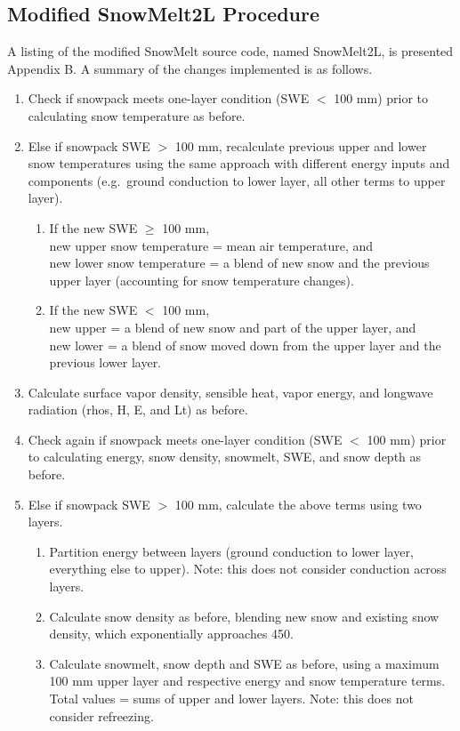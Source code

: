 \documentclass[12pt]{article}
\begin{document}
\subsection{Modified SnowMelt2L Procedure}
A listing of the modified SnowMelt source code, named SnowMelt2L, is presented Appendix B.
A summary of the changes implemented is as follows.
\begin{enumerate}
  \item Check if snowpack meets one-layer condition (SWE $<$ 100 mm) prior to calculating snow temperature as before.
  \item Else if snowpack SWE $>$ 100 mm, recalculate previous upper and lower snow temperatures using the same approach with different energy inputs and components (e.g.\ ground conduction to lower layer, all other terms to upper layer).
  \begin{enumerate}
    \item If the new SWE $\geq$ 100 mm, \\
    new upper snow temperature = mean air temperature, and \\
    new lower snow temperature = a blend of new snow and the previous upper layer (accounting for snow temperature changes).
    \item If the new SWE $<$ 100 mm, \\
    new upper = a blend of new snow and part of the upper layer, and \\
    new lower = a blend of snow moved down from the upper layer and the previous lower layer.
  \end{enumerate}
  \item Calculate surface vapor density, sensible heat, vapor energy, and longwave radiation (rhos, H, E, and Lt) as before.
  \item Check again if snowpack meets one-layer condition (SWE $<$ 100 mm) prior to calculating energy, snow density, snowmelt, SWE, and snow depth as before.
  \item Else if snowpack SWE $>$ 100 mm, calculate the above terms using two layers.
  \begin{enumerate}
    \item Partition energy between layers (ground conduction to lower layer, everything else to upper). Note: this does not consider conduction across layers.
    \item Calculate snow density as before, blending new snow and existing snow density, which exponentially approaches 450.
    \item Calculate snowmelt, snow depth and SWE as before, using a maximum 100 mm upper layer and respective energy and snow temperature terms. Total values = sums of upper and lower layers. Note: this does not consider refreezing.
  \end{enumerate}
\end{enumerate}
\end{document}
